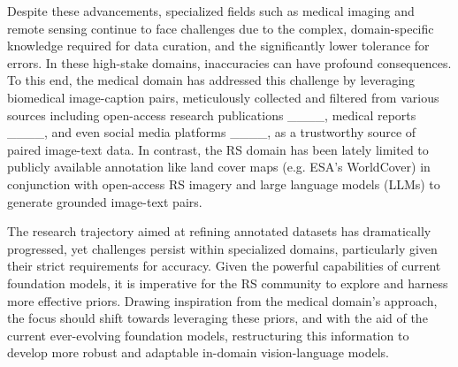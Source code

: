 Despite these advancements, specialized fields such as medical imaging and remote sensing continue to face challenges due to the complex, domain-specific knowledge required for data curation, and the significantly lower tolerance for errors. In these high-stake domains, inaccuracies can have profound consequences. To this end, the medical domain has addressed this challenge by leveraging biomedical image-caption pairs, meticulously collected and filtered from various sources including open-access research publications ____, medical reports ____, and even social media platforms ____, as a trustworthy source of paired image-text data. In contrast, the RS domain has been lately limited to publicly available annotation like land cover maps (e.g. ESA's WorldCover) in conjunction with open-access RS imagery and large language models (LLMs) to generate grounded image-text pairs.

The research trajectory aimed at refining annotated datasets has dramatically progressed, yet challenges persist within specialized domains, particularly given their strict requirements for accuracy. Given the powerful capabilities of current foundation models, it is imperative for the RS community to explore and harness more effective priors. Drawing inspiration from the medical domain's approach, the focus should shift towards leveraging these priors, and with the aid of the current ever-evolving foundation models, restructuring this information to develop more robust and adaptable in-domain vision-language models.